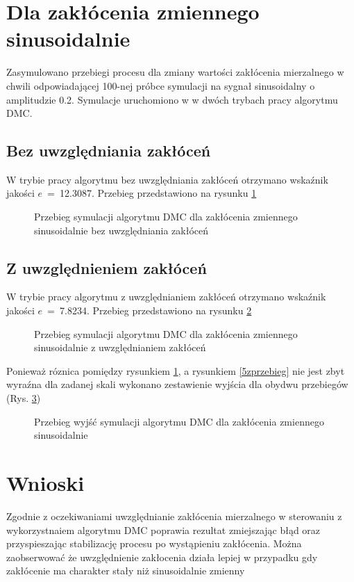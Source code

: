 \section{Dla zakłócenia zmiennego sinusoidalnie}

Zasymulowano przebiegi procesu dla zmiany wartości zakłócenia mierzalnego w chwili odpowiadającej 100-nej próbce symulacji na sygnał sinusoidalny o amplitudzie \num{0.2}. Symulacje uruchomiono w w dwóch trybach pracy algorytmu DMC.



\subsection{Bez uwzględniania zakłóceń}

W trybie pracy algorytmu bez uwzględniania zakłóceń otrzymano wskaźnik jakości $e$~=~\num{12.3087}. Przebieg przedstawiono na rysunku \ref{6przebieg}

\begin{figure}
	
	\centering
	\caption{ Przebieg symulacji algorytmu DMC dla zakłócenia zmiennego sinusoidalnie bez uwzględniania zakłóceń }
	
	\label{6przebieg}
\end{figure}

\subsection{Z uwzględnieniem zakłóceń}

W trybie pracy algorytmu z uwzględnianiem zakłóceń otrzymano wskaźnik jakości $e$~=~\num{7.8234}. Przebieg przedstawiono na rysunku \ref{6zprzebieg}

\begin{figure}
	
	\centering
	\caption{ Przebieg symulacji algorytmu DMC dla zakłócenia zmiennego sinusoidalnie z uwzględnianiem zakłóceń }
	
	\label{6zprzebieg}
\end{figure}

Ponieważ róznica pomiędzy rysunkiem \ref{6przebieg}, a rysunkiem \ref{5zprzebieg} nie jest zbyt wyraźna dla zadanej skali wykonano zestawienie wyjścia dla obydwu przebiegów (Rys. \ref{singraph})

\begin{figure}
	
	\centering
	\caption{ Przebieg wyjść symulacji algorytmu DMC dla zakłócenia zmiennego sinusoidalnie }
	
	\label{singraph}
\end{figure}

\section{Wnioski}

Zgodnie z oczekiwaniami uwzględnianie zakłócenia mierzalnego w sterowaniu z wykorzystnaiem algorytmu DMC poprawia rezultat zmiejszając błąd oraz przyspieszając stabilizację procesu po wystąpieniu zakłócenia. Można zaobserwować że uwzględnienie zakłocenia działa lepiej w przypadku gdy zakłócenie ma charakter stały niż sinusoidalnie zmienny